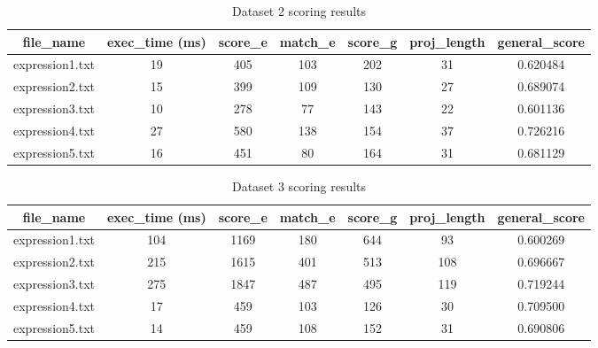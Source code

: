 \documentclass[12pt,a4paper]{article}
\begin{document}
\begin{table}[H]
	\begin{center}
		\caption{Dataset 2 scoring results}
		\begin{tabular}{|c|c|c|c|c|c|c|}
			\hline
			\textbf{file\_name} & \textbf{exec\_time} (ms) & \textbf{score\_e} & \textbf{match\_e} & \textbf{score\_g} & \textbf{proj\_length} & \textbf{general\_score} \\
			\hline\hline
			expression1.txt & 19 & 405 & 103 & 202 & 31 & 0.620484 \\
			\hline
			expression2.txt & 15 & 399 & 109 & 130 & 27 & 0.689074 \\
			\hline
			expression3.txt & 10 & 278 & 77  & 143 & 22 & 0.601136 \\
			\hline
			expression4.txt & 27 & 580 & 138 & 154 & 37 & 0.726216 \\
			\hline
			expression5.txt & 16 & 451 & 80  & 164 & 31 & 0.681129 \\
			\hline
		\end{tabular}
	\end{center}
\end{table}

\begin{table}[H]
	\begin{center}
		\caption{Dataset 3 scoring results}
		\begin{tabular}{|c|c|c|c|c|c|c|}
			\hline
			\textbf{file\_name} & \textbf{exec\_time} (ms) & \textbf{score\_e} & \textbf{match\_e} & \textbf{score\_g} & \textbf{proj\_length} & \textbf{general\_score} \\
			\hline\hline
			expression1.txt & 104 & 1169 & 180 & 644 & 93  & 0.600269 \\
			\hline
			expression2.txt & 215 & 1615 & 401 & 513 & 108 & 0.696667 \\
			\hline
			expression3.txt & 275 & 1847 & 487 & 495 & 119 & 0.719244 \\
			\hline
			expression4.txt & 17  & 459  & 103 & 126 & 30  & 0.709500 \\
			\hline
			expression5.txt & 14  & 459  & 108 & 152 & 31  & 0.690806 \\
			\hline
		\end{tabular}
	\end{center}
\end{table}
\end{document}
